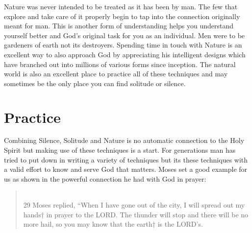 \documentclass[11pt,a4paper]{scrartcl} %
\begin{document}
\begin{doublespace}
Nature was never intended to be treated as it has been by man. The few that explore and take care of it properly begin to tap into the connection originally meant for man. This is another form of understanding helps you understand yourself better and God's original task for you as an individual. Men were to be gardeners of earth not its destroyers. Spending time in touch with Nature is an excellent way to also approach God by appreciating his intelligent designs which have branched out into millions of various forms since inception. The natural world is also an excellent place to practice all of these techniques and may sometimes be the only place you can find solitude or silence. 
\section{Practice}
Combining Silence, Solitude and Nature is no automatic connection to the Holy Spirit but making use of these techniques is a start. For generations man has tried to put down in writing a variety of techniques but its these techniques with a valid effort to know and serve God that matters. Moses set a good example for us as shown in the powerful connection he had with God in prayer:
\begin{verse}
\textcolor{Maroon}{}\\
29 Moses replied, “When I have gone out of the city, I will spread out my hands† in prayer to the LORD. The thunder will stop and there will be no more hail, so you may know that the earth† is the LORD’s. 
\end{verse} 
\end{doublespace}
\clearpage
    \nocite{*}
    
    
\end{document}

